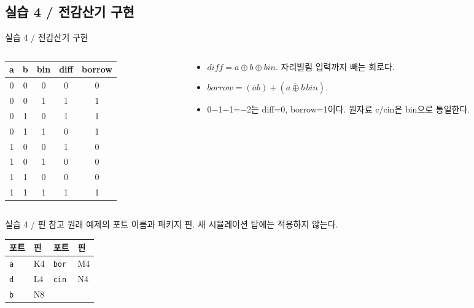\documentclass[aspectratio=169,11pt]{beamer}
\newcommand{\sourceref}[1]{}
\begin{document}
\subsection{실습 4 / 전감산기 구현}
\begin{frame}[t]{실습 4 / 전감산기 구현}
\small
\begin{columns}[T,onlytextwidth]\begin{column}{0.47\textwidth}\begin{center}\renewcommand{\arraystretch}{1.12}\begin{tabular}{ccccc}\hline a & b & bin & diff & borrow\\\hline 0 & 0 & 0 & 0 & 0\\
0 & 0 & 1 & 1 & 1\\
0 & 1 & 0 & 1 & 1\\
0 & 1 & 1 & 0 & 1\\
1 & 0 & 0 & 1 & 0\\
1 & 0 & 1 & 0 & 0\\
1 & 1 & 0 & 0 & 0\\
1 & 1 & 1 & 1 & 1\\\hline\end{tabular}\end{center}\end{column}\begin{column}{0.49\textwidth}\begin{itemize}\setlength{\itemsep}{0.5em}\item $diff=a\oplus b\oplus bin$. 자리빌림 입력까지 빼는 회로다.
\item $borrow=(\overline a b)+(\overline{a\oplus b}\,bin)$.
\item 0−1−1=−2는 diff=0, borrow=1이다. 원자료 c/cin은 bin으로 통일한다.\end{itemize}\end{column}\end{columns}
\sourceref{2.2\_논리 게이트 구현, p.133, 134}
\end{frame}

\begin{frame}[t]{실습 4 / 핀 참고}
\fontsize{8}{9}\selectfont
원래 예제의 포트 이름과 패키지 핀. 새 시뮬레이션 탑에는 적용하지 않는다.
\begin{center}\renewcommand{\arraystretch}{1.0}
\begin{tabular}{ll@{\hspace{1.1cm}}ll}\toprule
포트 & 핀 & 포트 & 핀\\\midrule
\texttt{a} & K4 & \texttt{bor} & M4 \\
\texttt{d} & L4 & \texttt{cin} & N4 \\
\texttt{b} & N8 & \texttt{} &  \\\bottomrule\end{tabular}\end{center}
{\scriptsize \par}
\sourceref{2.2\_논리 게이트 구현, p.149}\end{frame}
\end{document}
